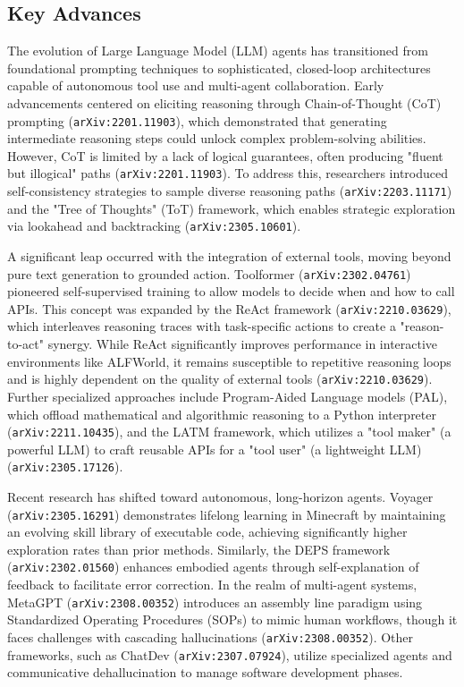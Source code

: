 \documentclass[11pt]{article}
\begin{document}
\subsection{Key Advances}

The evolution of Large Language Model (LLM) agents has transitioned from foundational prompting techniques to sophisticated, closed-loop architectures capable of autonomous tool use and multi-agent collaboration. Early advancements centered on eliciting reasoning through Chain-of-Thought (CoT) prompting (\texttt{arXiv:2201.11903}), which demonstrated that generating intermediate reasoning steps could unlock complex problem-solving abilities. However, CoT is limited by a lack of logical guarantees, often producing "fluent but illogical" paths (\texttt{arXiv:2201.11903}). To address this, researchers introduced self-consistency strategies to sample diverse reasoning paths (\texttt{arXiv:2203.11171}) and the "Tree of Thoughts" (ToT) framework, which enables strategic exploration via lookahead and backtracking (\texttt{arXiv:2305.10601}).

A significant leap occurred with the integration of external tools, moving beyond pure text generation to grounded action. Toolformer (\texttt{arXiv:2302.04761}) pioneered self-supervised training to allow models to decide when and how to call APIs. This concept was expanded by the ReAct framework (\texttt{arXiv:2210.03629}), which interleaves reasoning traces with task-specific actions to create a "reason-to-act" synergy. While ReAct significantly improves performance in interactive environments like ALFWorld, it remains susceptible to repetitive reasoning loops and is highly dependent on the quality of external tools (\texttt{arXiv:2210.03629}). Further specialized approaches include Program-Aided Language models (PAL), which offload mathematical and algorithmic reasoning to a Python interpreter (\texttt{arXiv:2211.10435}), and the LATM framework, which utilizes a "tool maker" (a powerful LLM) to craft reusable APIs for a "tool user" (a lightweight LLM) (\texttt{arXiv:2305.17126}).

Recent research has shifted toward autonomous, long-horizon agents. Voyager (\texttt{arXiv:2305.16291}) demonstrates lifelong learning in Minecraft by maintaining an evolving skill library of executable code, achieving significantly higher exploration rates than prior methods. Similarly, the DEPS framework (\texttt{arXiv:2302.01560}) enhances embodied agents through self-explanation of feedback to facilitate error correction. In the realm of multi-agent systems, MetaGPT (\texttt{arXiv:2308.00352}) introduces an assembly line paradigm using Standardized Operating Procedures (SOPs) to mimic human workflows, though it faces challenges with cascading hallucinations (\texttt{arXiv:2308.00352}). Other frameworks, such as ChatDev (\texttt{arXiv:2307.07924}), utilize specialized agents and communicative dehallucination to manage software development phases.
\end{document}
